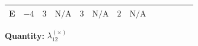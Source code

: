 \documentclass[8pt]{article}
\begin{document}
\begin{landscape}
\begin{longtable}{@{}llcccccc >{\raggedright\arraybackslash}p{0.21\linewidth} >{\raggedright\arraybackslash}p{0.21\linewidth} >{\raggedright\arraybackslash}p{0.21\linewidth}@{}}
\midrule
E & $-4$ & $3$ & $\text{N/A}$ & $3$ & $\text{N/A}$ & $2$ & $\text{N/A}$ & \scriptsize\adjustbox{max width=\linewidth}{$\begin{gathered} +10 {\lambda_{12}^{(\times)}}^2\end{gathered}$} & \scriptsize\adjustbox{max width=\linewidth}{$\begin{gathered} +2 {\lambda_{12}^{(\times)}} {\lambda_{S_1}^{(1)}}\end{gathered}$} & \scriptsize\adjustbox{max width=\linewidth}{$\begin{gathered} -2 {\lambda_{12}^{(\times)}} {\lambda_{S_1}^{(A)}}\end{gathered}$} \\
\midrule
\bottomrule
\end{longtable}
\clearpage
\noindent\textbf{Quantity: }$\lambda_{12}^{(\times)}$\par\smallskip

\end{landscape}
\end{document}
